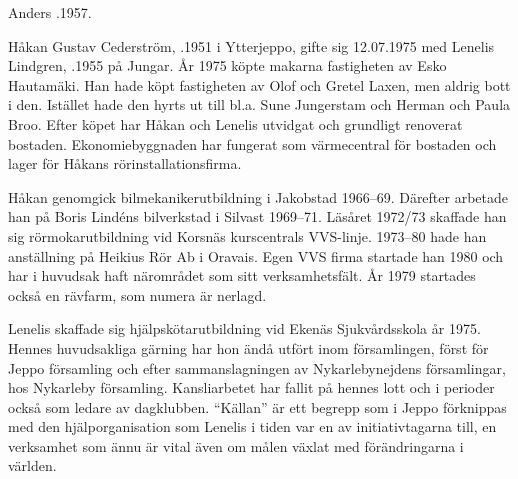 Anders .1957.






Håkan Gustav Cederström, .1951 i Ytterjeppo, gifte sig 12.07.1975 med Lenelis Lindgren, .1955 på Jungar. År 1975 köpte makarna fastigheten av Esko Hautamäki. Han hade köpt fastigheten av Olof och Gretel Laxen, men aldrig bott i den. Istället hade den hyrts ut till bl.a. Sune Jungerstam och Herman och Paula Broo. Efter köpet har Håkan och Lenelis utvidgat och grundligt renoverat bostaden. Ekonomiebyggnaden har fungerat som värmecentral för bostaden och lager för Håkans rörinstallationsfirma.

Håkan genomgick bilmekanikerutbildning i Jakobstad 1966--69. Därefter arbetade han på Boris Lindéns bilverkstad i Silvast 1969--71. Läsåret 1972/73 skaffade han sig rörmokarutbildning vid Korsnäs kurscentrals VVS-linje. 1973--80 hade han anställning på Heikius Rör Ab i Oravais. Egen VVS firma startade han 1980 och har i huvudsak haft närområdet som sitt verksamhetsfält. År 1979 startades också en rävfarm, som numera är nerlagd.

Lenelis skaffade sig hjälpskötarutbildning vid Ekenäs Sjukvårdsskola år 1975. Hennes huvudsakliga gärning har hon ändå utfört inom församlingen, först för Jeppo församling och efter sammanslagningen av Nykarlebynejdens församlingar, hos Nykarleby församling.  Kansliarbetet har fallit på hennes lott och i perioder också som ledare av dagklubben. ``Källan'' är ett begrepp som i Jeppo förknippas med den hjälporganisation som Lenelis i tiden var en av initiativtagarna till, en verksamhet som ännu är vital även om målen växlat med förändringarna i världen.
\begin{jhchildren}
  \item {}
  \item {}
  \item {}
\end{jhchildren}


